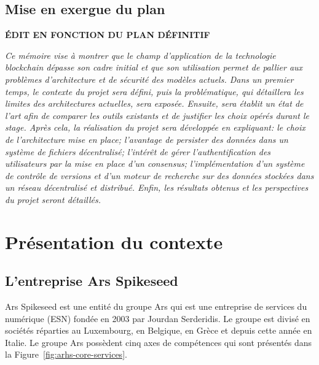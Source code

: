 \documentclass{tnreport}
\begin{document}
\section{Mise en exergue du plan}

\textbf{ÉDIT EN FONCTION DU PLAN DÉFINITIF}

\textit{
Ce mémoire vise à montrer que le champ d'application de la technologie blockchain dépasse son cadre initial et que son utilisation permet de pallier aux problèmes d'architecture et de sécurité des modèles actuels. 
Dans un premier temps, le contexte du projet sera défini, puis la problématique, qui détaillera les limites des architectures actuelles, sera exposée. 
Ensuite, sera établit un état de l'art afin de comparer les outils existants et de justifier les choix opérés durant le stage. 
Après cela, la réalisation du projet sera développée en expliquant: 
le choix de l'architecture mise en place; 
l'avantage de persister des données dans un système de fichiers décentralisé; 
l'intérêt de gérer l'authentification des utilisateurs par la mise en place d'un consensus; 
l'implémentation d'un système de contrôle de versions et d'un moteur de recherche sur des données stockées dans un réseau décentralisé et distribué. 
Enfin, les résultats obtenus et les perspectives du projet seront détaillés.
}

\chapter{Présentation du contexte}

\section{L'entreprise Ar{\texteta}s Spikeseed}

Ar{\texteta}s Spikeseed est une entité du groupe Ar{\texteta}s qui est une entreprise de services du numérique (ESN) fondée en 2003 par Jourdan Serderidis. 
Le groupe est divisé en sociétés réparties au Luxembourg, en Belgique, en Grèce et depuis cette année en Italie. Le groupe Ar{\texteta}s possèdent cinq axes de compétences qui sont présentés dans la Figure~\ref{fig:arhs-core-services}.
\end{document}
